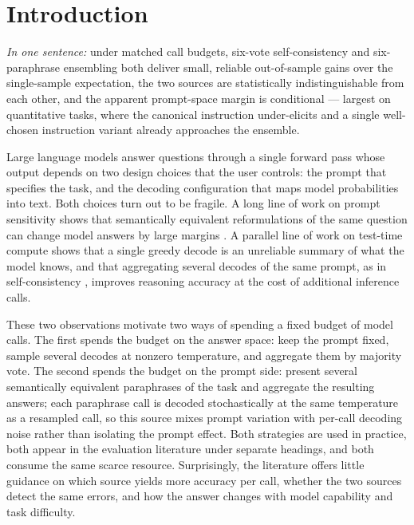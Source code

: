 \section{Introduction}
\label{sec:intro}

\emph{In one sentence:} under matched call budgets, six-vote self-consistency and six-paraphrase ensembling both deliver small, reliable out-of-sample gains over the single-sample expectation, the two sources are statistically indistinguishable from each other, and the apparent prompt-space margin is conditional --- largest on quantitative tasks, where the canonical instruction under-elicits and a single well-chosen instruction variant already approaches the ensemble.

Large language models answer questions through a single forward pass whose output depends on two design choices that the user controls: the prompt that specifies the task, and the decoding configuration that maps model probabilities into text. Both choices turn out to be fragile. A long line of work on prompt sensitivity shows that semantically equivalent reformulations of the same question can change model answers by large margins \citep{mizrahi2024state,sclar2024quantifying,leidinger2023language,zhu2023promptbench}. A parallel line of work on test-time compute shows that a single greedy decode is an unreliable summary of what the model knows, and that aggregating several decodes of the same prompt, as in self-consistency \citep{wang2023selfconsistency}, improves reasoning accuracy at the cost of additional inference calls.

These two observations motivate two ways of spending a fixed budget of model calls. The first spends the budget on the answer space: keep the prompt fixed, sample several decodes at nonzero temperature, and aggregate them by majority vote. The second spends the budget on the prompt side: present several semantically equivalent paraphrases of the task and aggregate the resulting answers; each paraphrase call is decoded stochastically at the same temperature as a resampled call, so this source mixes prompt variation with per-call decoding noise rather than isolating the prompt effect. Both strategies are used in practice, both appear in the evaluation literature under separate headings, and both consume the same scarce resource. Surprisingly, the literature offers little guidance on which source yields more accuracy per call, whether the two sources detect the same errors, and how the answer changes with model capability and task difficulty.

